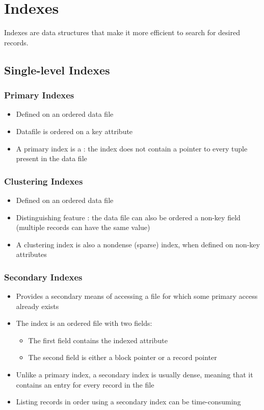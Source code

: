 \section{Indexes}

Indexes are data structures that make it more efficient to search for desired records.

\subsection{Single-level Indexes}

\subsubsection{Primary Indexes}

\begin{itemize}
    \item Defined on an ordered data file
    \item Datafile is ordered on a key attribute
    \item A primary index is a  : the index does not contain a pointer to every tuple present in the data file
\end{itemize}

\subsubsection{Clustering Indexes}

\begin{itemize}
    \item Defined on an ordered data file
    \item Distinguishing feature : the data file can also be ordered a non-key field (multiple records can have the same value)
    \item A clustering index is also a nondense (sparse) index, when defined on non-key attributes
\end{itemize}

\subsubsection{Secondary Indexes}

\begin{itemize}
    \item Provides a secondary means of accessing a file for which some primary access already exists
    \item The index is an ordered file with two fields:
    \begin{itemize}
        \item The first field contains the indexed attribute
        \item The second field is either a block pointer or a record pointer
    \end{itemize}
    \item Unlike a primary index, a secondary index is usually dense, meaning that it contains an entry for every record in the file
    \item Listing records in order using a secondary index can be time-consuming
\end{itemize}

